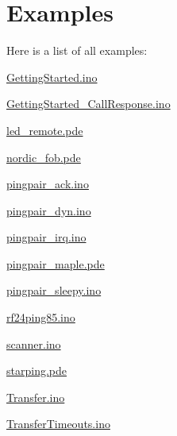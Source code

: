 \section{Examples}
Here is a list of all examples\+:\begin{DoxyCompactItemize}
\item 
\hyperlink{_getting_started_8ino-example}{Getting\+Started.\+ino}
\item 
\hyperlink{_getting_started__call_response_8ino-example}{Getting\+Started\+\_\+\+Call\+Response.\+ino}
\item 
\hyperlink{led_remote_8pde-example}{led\+\_\+remote.\+pde}
\item 
\hyperlink{nordic_fob_8pde-example}{nordic\+\_\+fob.\+pde}
\item 
\hyperlink{pingpair_ack_8ino-example}{pingpair\+\_\+ack.\+ino}
\item 
\hyperlink{pingpair_dyn_8ino-example}{pingpair\+\_\+dyn.\+ino}
\item 
\hyperlink{pingpair_irq_8ino-example}{pingpair\+\_\+irq.\+ino}
\item 
\hyperlink{pingpair_maple_8pde-example}{pingpair\+\_\+maple.\+pde}
\item 
\hyperlink{pingpair_sleepy_8ino-example}{pingpair\+\_\+sleepy.\+ino}
\item 
\hyperlink{rf24ping85_8ino-example}{rf24ping85.\+ino}
\item 
\hyperlink{scanner_8ino-example}{scanner.\+ino}
\item 
\hyperlink{starping_8pde-example}{starping.\+pde}
\item 
\hyperlink{_transfer_8ino-example}{Transfer.\+ino}
\item 
\hyperlink{_transfer_timeouts_8ino-example}{Transfer\+Timeouts.\+ino}
\end{DoxyCompactItemize}
